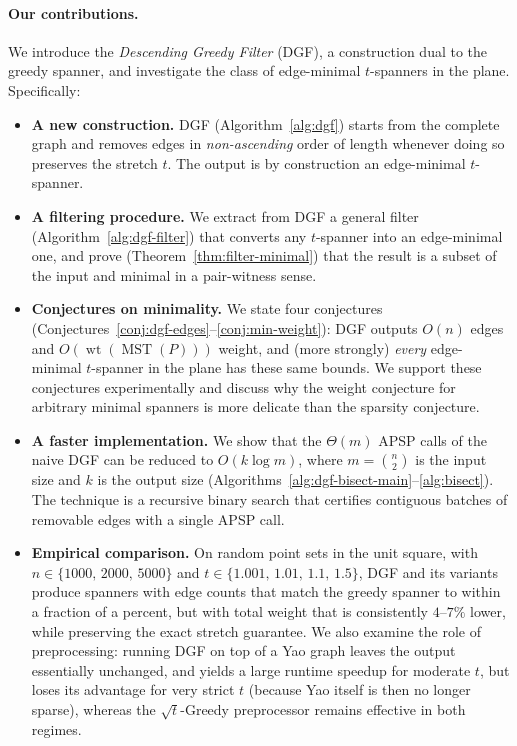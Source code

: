 \documentclass{cccg26}
\DeclareMathOperator{\wt}{wt}
\DeclareMathOperator{\MST}{MST}
\begin{document}
\paragraph{Our contributions.}
We introduce the \emph{Descending Greedy Filter} (DGF), a construction
dual to the greedy spanner, and investigate the class of edge-minimal
$t$-spanners in the plane. Specifically:
\begin{itemize}
  \item \textbf{A new construction.} DGF (Algorithm~\ref{alg:dgf})
    starts from the complete graph and removes edges in
    \emph{non-ascending} order of length whenever doing so preserves
    the stretch $t$. The output is by construction an edge-minimal
    $t$-spanner.
  \item \textbf{A filtering procedure.} We extract from DGF a general
    filter (Algorithm~\ref{alg:dgf-filter}) that converts any
    $t$-spanner into an edge-minimal one, and prove
    (Theorem~\ref{thm:filter-minimal}) that the result is a subset of
    the input and minimal in a pair-witness sense.
  \item \textbf{Conjectures on minimality.} We state four conjectures
    (Conjectures~\ref{conj:dgf-edges}--\ref{conj:min-weight}): DGF
    outputs $O(n)$ edges and $O(\wt(\MST(P)))$ weight, and (more
    strongly) \emph{every} edge-minimal $t$-spanner in the plane has
    these same bounds. We support these conjectures experimentally and
    discuss why the weight conjecture for arbitrary minimal spanners
    is more delicate than the sparsity conjecture.
  \item \textbf{A faster implementation.} We show that the $\Theta(m)$
    APSP calls of the naive DGF can be reduced to $O(k\log m)$, where
    $m=\binom{n}{2}$ is the input size and $k$ is the output size
    (Algorithms~\ref{alg:dgf-bisect-main}--\ref{alg:bisect}). The
    technique is a recursive binary search that certifies contiguous
    batches of removable edges with a single APSP call.
  \item \textbf{Empirical comparison.} On random point sets in the
    unit square, with $n\in\{1000,\,2000,\,5000\}$ and
    $t\in\{1.001,\,1.01,\,1.1,\,1.5\}$, DGF and its variants produce
    spanners with edge counts that match the greedy spanner to
    within a fraction of a percent, but with total weight that is
    consistently $4$--$7\%$ lower, while preserving the exact stretch
    guarantee. We also examine the role of preprocessing: running DGF
    on top of a Yao graph leaves the output essentially unchanged, and
    yields a large runtime speedup for moderate $t$, but loses its
    advantage for very strict $t$ (because Yao itself is then no
    longer sparse), whereas the $\sqrt{t}$-Greedy preprocessor remains
    effective in both regimes.
\end{itemize}
\end{document}
